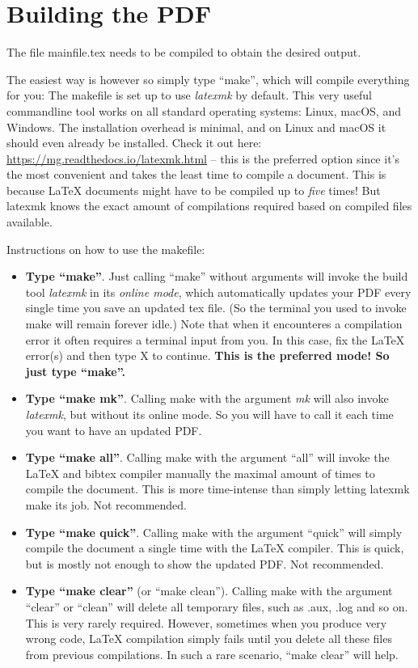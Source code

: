 \pagebreak %
\section{Building the PDF}

The file mainfile.tex needs to be compiled to obtain the desired output. 

The easiest way is however so simply type ``make'', which will compile everything for you: The makefile is set up to use \emph{latexmk} by default. This very useful commandline tool works on all standard operating systems: Linux, macOS, and Windows. The installation overhead is minimal, and on Linux and macOS it should even already be installed. Check it out here: \url{https://mg.readthedocs.io/latexmk.html} -- this is the preferred option since it's the most convenient and takes the least time to compile a document. This is because \LaTeX{} documents might have to be compiled up to \emph{five} times! But latexmk knows the exact amount of compilations required based on compiled files available.

Instructions on how to use the makefile:
\begin{itemize}
  \item \textbf{Type ``make''}. Just calling ``make'' without arguments will invoke the build tool \emph{latexmk} in its \emph{online mode}, which automatically updates your PDF every single time you save an updated tex file. (So the terminal you used to invoke make will remain forever idle.) Note that when it encounteres a compilation error it often requires a terminal input from you. In this case, fix the \LaTeX{} error(s) and then type X to continue. \textbf{This is the preferred mode! So just type ``make''.}
  \item \textbf{Type ``make mk''}. Calling make with the argument \emph{mk} will also invoke \emph{latexmk}, but without its online mode. So you will have to call it each time you want to have an updated PDF.
  \item \textbf{Type ``make all''}. Calling make with the argument ``all'' will invoke the \LaTeX{} and bibtex compiler manually the maximal amount of times to compile the document. This is more time-intense than simply letting latexmk make its job. Not recommended.
  \item  \textbf{Type ``make quick''}. Calling make with the argument ``quick'' will simply compile the document a single time with the \LaTeX{} compiler. This is quick, but is mostly not enough to show the updated PDF. Not recommended.
  \item \textbf{Type ``make clear''} (or ``make clean''). Calling make with the argument ``clear'' or ``clean'' will delete all temporary files, such as .aux, .log and so on. This is very rarely required. However, sometimes when you produce very wrong code, \LaTeX{} compilation simply fails until you delete all these files from previous compilations. In such a rare scenario, ``make clear'' will help.
\end{itemize}

